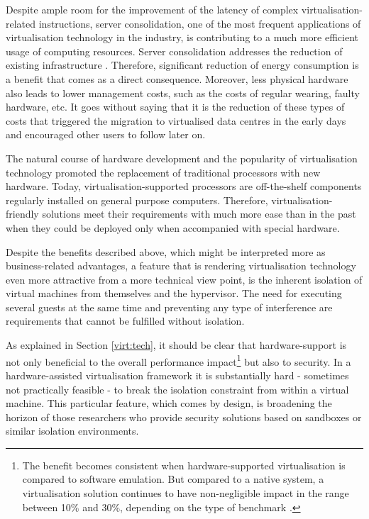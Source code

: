 Despite ample room for the improvement of the latency of complex virtualisation-related instructions, server consolidation, one of the most frequent applications of virtualisation technology in the industry, is contributing to a much more efficient usage of computing resources. Server consolidation addresses the reduction of existing infrastructure \cite{consolidation}. Therefore, significant reduction of energy consumption is a benefit that comes as a direct consequence. Moreover, less physical hardware also leads to lower management costs, such as the costs of regular wearing, faulty hardware, etc. 
It goes without saying that it is the reduction of these types of costs that triggered the migration to virtualised data centres in the early days and encouraged other users to follow later on.%

The natural course of hardware development and the popularity of virtualisation technology promoted the replacement of traditional processors with new hardware. Today, virtualisation-supported processors are off-the-shelf components regularly installed on general purpose computers. Therefore, virtualisation-friendly solutions meet their requirements with much more ease than in the past when they could be deployed only when accompanied with special hardware.

Despite the benefits described above, which might be interpreted more as business-related advantages, a feature that is rendering virtualisation technology even more attractive from a more technical view point, is the inherent isolation of virtual machines from themselves and the hypervisor. The need for executing several guests at the same time and preventing any type of interference are requirements that cannot be fulfilled without isolation.

As explained in Section \ref{virt:tech}, it should be clear that hardware-support is not only beneficial to the overall performance impact\footnote{The benefit becomes consistent when hardware-supported virtualisation is compared to software emulation. But compared to a native system, a virtualisation solution continues to have non-negligible impact in the range between 10\% and 30\%, depending on the type of benchmark \cite{hypercomp}.} but also to security. In a hardware-assisted virtualisation framework it is substantially hard - sometimes not practically feasible - to break the isolation constraint from within a virtual machine. 
This particular feature, which comes by design, is broadening the horizon of those researchers who provide security solutions based on sandboxes or similar isolation environments.%
 

